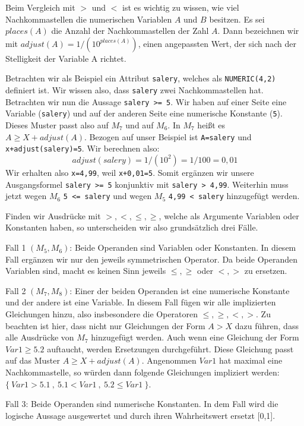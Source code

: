 Beim Vergleich mit $>$ und $<$ ist es wichtig zu wissen, wie viel Nachkommastellen die numerischen Variablen $A$ und $B$ besitzen. Es sei $\mathit{places}(A)$ die Anzahl der Nachkommastellen der Zahl $A$. Dann bezeichnen wir mit $\mathit{adjust}(A) = 1 / (10^{\mathit{places}(A)})$, einen angepassten Wert, der sich nach der Stelligkeit der Variable A richtet.

Betrachten wir als Beispiel ein Attribut \verb|salery|, welches als \verb|NUMERIC(4,2)| definiert ist. Wir wissen also, dass \verb|salery| zwei Nachkommastellen hat. Betrachten wir nun die Aussage \verb|salery >= 5|.
Wir haben auf einer Seite eine Variable (\verb|salery|) und auf der anderen Seite eine numerische Konstante (\verb|5|). Dieses Muster passt also auf $M_7$ und auf $M_6$. In $M_7$ heißt es $A\geq X+\mathit{adjust}(A)$. Bezogen auf unser Beispiel ist \verb|A=salery| und \verb|x+adjust(salery)=5|. Wir berechnen also: 
$$\mathit{adjust}(\mathit{salery}) = 1 / (10^{2}) = 1/100 = 0,01$$
Wir erhalten also \verb|x=4,99|, weil \verb|x+0,01=5|. Somit ergänzen wir unsere Ausgangsformel \verb|salery >= 5| konjunktiv mit \verb|salery > 4,99|. Weiterhin muss jetzt wegen $M_6$ \verb|5 <= salery| und wegen $M_5$ \verb|4,99 < salery| hinzugefügt werden.

Finden wir Ausdrücke mit $>,<,\leq,\geq$, welche als Argumente Variablen oder Konstanten haben, so unterscheiden wir also grundsätzlich drei Fälle.

Fall 1 $(M_5,M_6)$: Beide Operanden sind Variablen oder Konstanten. In diesem Fall ergänzen wir nur den jeweils symmetrischen Operator. Da beide Operanden Variablen sind, macht es keinen Sinn jeweils $\leq,\geq$ oder $<,>$ zu ersetzen.

Fall 2 $(M_7,M_8)$: Einer der beiden Operanden ist eine numerische Konstante und der andere ist eine Variable. In diesem Fall fügen wir alle implizierten Gleichungen hinzu, also insbesondere die Operatoren $\leq,\geq,<,>$. Zu beachten ist hier, dass nicht nur Gleichungen der Form $A>X$ dazu führen, dass alle Ausdrücke von $M_7$ hinzugefügt werden. Auch wenn eine Gleichung der Form $Var1\geq 5.2$ auftaucht, werden Ersetzungen durchgeführt. Diese Gleichung passt auf das Muster $A\geq X+\mathit{adjust}(A)$. Angenommen $Var1$ hat maximal eine Nachkommastelle, so würden dann folgende Gleichungen impliziert werden: $\{\ Var1>5.1\ ,\ 5.1<Var1\ ,\ 5.2 \leq Var1\ \}$.

Fall 3: Beide Operanden sind numerische Konstanten. In dem Fall wird die logische Aussage ausgewertet und durch ihren Wahrheitswert ersetzt [0,1].

